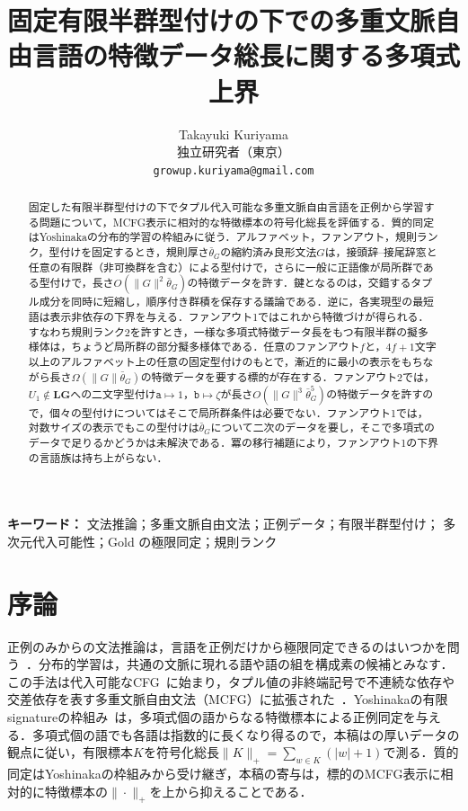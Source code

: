 \documentclass[11pt,a4paper]{ltjsarticle}
\title{固定有限半群型付けの下での多重文脈自由言語の特徴データ総長に関する多項式上界}
\author{Takayuki Kuriyama\\
独立研究者（東京）\\
\texttt{growup.kuriyama@gmail.com}}
\date{}
\numberwithin{equation}{section}
\theoremstyle{plain}
\theoremstyle{definition}
\theoremstyle{remark}
\begin{document}
\maketitle

\begin{abstract}
固定した有限半群型付けの下でタプル代入可能な多重文脈自由言語を正例から学習する問題について，MCFG表示に相対的な特徴標本の符号化総長を評価する．質的同定はYoshinakaの分布的学習の枠組みに従う．アルファベット，ファンアウト，規則ランク，型付けを固定するとき，規則厚さ$\bar\theta_G$の縮約済み良形文法$G$は，接頭辞--接尾辞窓と任意の有限群（非可換群を含む）による型付けで，さらに一般に正語像が局所群である型付けで，長さ$O(\|G\|^2\bar\theta_G)$の特徴データを許す．鍵となるのは，交錯するタプル成分を同時に短縮し，順序付き群積を保存する議論である．逆に，各実現型の最短語は表示非依存の下界を与える．ファンアウト1ではこれから特徴づけが得られる．すなわち規則ランク2を許すとき，一様な多項式特徴データ長をもつ有限半群の擬多様体は，ちょうど局所群の部分擬多様体である．任意のファンアウト$f$と，$4f+1$文字以上のアルファベット上の任意の固定型付けのもとで，漸近的に最小の表示をもちながら長さ$\Omega(\|G\|\bar\theta_G)$の特徴データを要する標的が存在する．ファンアウト2では，$U_1\notin\mathbf{LG}$への二文字型付け$\mathtt a\mapsto1$，$\mathtt b\mapsto\zeta$が長さ$O(\|G\|^3\bar\theta_G^5)$の特徴データを許すので，個々の型付けについてはそこで局所群条件は必要でない．ファンアウト1では，対数サイズの表示でもこの型付けは$\bar\theta_G$について二次のデータを要し，そこで多項式のデータで足りるかどうかは未解決である．冪の移行補題により，ファンアウト1の下界の言語族は持ち上がらない．
\end{abstract}
\medskip
\noindent\textbf{キーワード：}
文法推論；多重文脈自由文法；正例データ；有限半群型付け；
多次元代入可能性；Gold の極限同定；規則ランク
\medskip

\section{序論}
\label{sec:introduction}

正例のみからの文法推論は，言語を正例だけから極限同定できるのはいつかを問う~\cite{Gold1967,Angluin1980}．分布的学習は，共通の文脈に現れる語や語の組を構成素の候補とみなす．この手法は代入可能なCFG~\cite{ClarkEyraud2007,Yoshinaka2008}に始まり，タプル値の非終端記号で不連続な依存や交差依存を表す多重文脈自由文法（MCFG）に拡張された~\cite{SekiEtAl1991,Yoshinaka2009,Yoshinaka2011,Kallmeyer2010}．Yoshinakaの有限signatureの枠組み~\cite{Yoshinaka2015General}は，多項式個の語からなる特徴標本による正例同定を与える．多項式個の語でも各語は指数的に長くなり得るので，本稿は\cite[Section~2.5.2]{EyraudHeinzYoshinaka2016}の厚いデータの観点に従い，有限標本$K$を符号化総長$\|K\|_+=\sum_{w\in K}(|w|+1)$で測る．質的同定はYoshinakaの枠組みから受け継ぎ，本稿の寄与は，標的のMCFG表示に相対的に特徴標本の$\|\cdot\|_+$を上から抑えることである．
\end{document}
